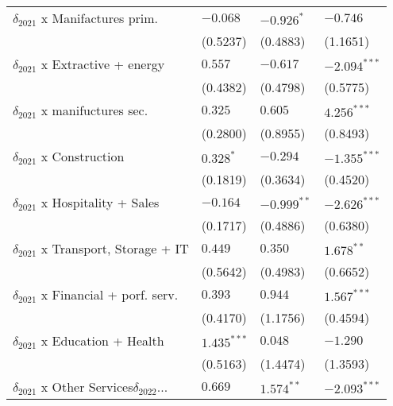 \begin{tabular}{llll}
$\delta_{2021}$ x Manifactures prim.               &           $-0.068$ &         $-0.926^*$ &           $-0.746$ \\
                                                   &           (0.5237) &           (0.4883) &           (1.1651) \\
$\delta_{2021}$ x Extractive + energy              &            $0.557$ &           $-0.617$ &     $-2.094^{***}$ \\
                                                   &           (0.4382) &           (0.4798) &           (0.5775) \\
$\delta_{2021}$ x manifuctures sec.                &            $0.325$ &            $0.605$ &      $4.256^{***}$ \\
                                                   &           (0.2800) &           (0.8955) &           (0.8493) \\
$\delta_{2021}$ x Construction                     &          $0.328^*$ &           $-0.294$ &     $-1.355^{***}$ \\
                                                   &           (0.1819) &           (0.3634) &           (0.4520) \\
$\delta_{2021}$ x Hospitality + Sales              &           $-0.164$ &      $-0.999^{**}$ &     $-2.626^{***}$ \\
                                                   &           (0.1717) &           (0.4886) &           (0.6380) \\
$\delta_{2021}$ x Transport, Storage + IT          &            $0.449$ &            $0.350$ &       $1.678^{**}$ \\
                                                   &           (0.5642) &           (0.4983) &           (0.6652) \\
$\delta_{2021}$ x Financial + porf. serv.          &            $0.393$ &            $0.944$ &      $1.567^{***}$ \\
                                                   &           (0.4170) &           (1.1756) &           (0.4594) \\
$\delta_{2021}$ x Education + Health               &      $1.435^{***}$ &            $0.048$ &           $-1.290$ \\
                                                   &           (0.5163) &           (1.4474) &           (1.3593) \\
$\delta_{2021}$ x Other Services$\delta_{2022}$... &            $0.669$ &       $1.574^{**}$ &     $-2.093^{***}$ \\

\end{tabular}
